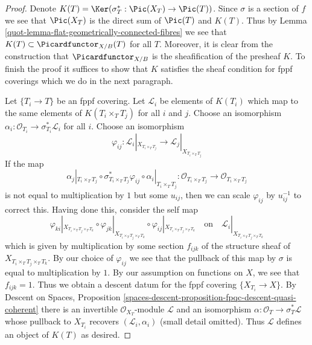 \begin{proof}

Denote $K(T) = \Ker(\sigma_T^* : \Pic(X_T) \to \Pic(T))$.
Since $\sigma$ is a section of $f$ we see that $\Pic(X_T)$ is the direct
sum of $\Pic(T)$ and $K(T)$.
Thus by Lemma \ref{quot-lemma-flat-geometrically-connected-fibres} we see that
$K(T) \subset \Picardfunctor_{X/B}(T)$ for all $T$. Moreover, it is clear
from the construction that $\Picardfunctor_{X/B}$ is the sheafification
of the presheaf $K$. To finish the proof it suffices to show that
$K$ satisfies the sheaf condition for fppf coverings which we do
in the next paragraph.

\medskip\noindent
Let $\{T_i \to T\}$ be an fppf covering. Let $\mathcal{L}_i$ be
elements of $K(T_i)$ which map to the same elements of $K(T_i \times_T T_j)$
for all $i$ and $j$. Choose an isomorphism
$\alpha_i : \mathcal{O}_{T_i} \to \sigma_{T_i}^*\mathcal{L}_i$
for all $i$. Choose an isomorphism
$$
\varphi_{ij} :
\mathcal{L}_i|_{X_{T_i \times_T T_j}}
\longrightarrow
\mathcal{L}_j|_{X_{T_i \times_T T_j}}
$$
If the map
$$
\alpha_j|_{T_i \times_T T_j} \circ
\sigma_{T_i \times_T T_j}^*\varphi_{ij} \circ
\alpha_i|_{T_i \times_T T_j} :
\mathcal{O}_{T_i \times_T T_j} \to \mathcal{O}_{T_i \times_T T_j}
$$
is not equal to multiplication by $1$ but some $u_{ij}$, then we can scale
$\varphi_{ij}$ by $u_{ij}^{-1}$ to correct this. Having done this, consider
the self map
$$
\varphi_{ki}|_{X_{T_i \times_T T_j \times_T T_k}} \circ
\varphi_{jk}|_{X_{T_i \times_T T_j \times_T T_k}} \circ
\varphi_{ij}|_{X_{T_i \times_T T_j \times_T T_k}}
\quad\text{on}\quad
\mathcal{L}_i|_{X_{T_i \times_T T_j \times_T T_k}}
$$
which is given by multiplication by some section $f_{ijk}$
of the structure sheaf of $X_{T_i \times_T T_j \times_T T_k}$.
By our choice of $\varphi_{ij}$ we see that the pullback of
this map by $\sigma$ is equal to multiplication by $1$. By
our assumption on functions on $X$, we see that $f_{ijk} = 1$.
Thus we obtain a descent datum for the fppf covering
$\{X_{T_i} \to X\}$. By
Descent on Spaces, Proposition
\ref{spaces-descent-proposition-fpqc-descent-quasi-coherent}
there is an invertible $\mathcal{O}_{X_T}$-module $\mathcal{L}$
and an isomorphism $\alpha : \mathcal{O}_T \to \sigma_T^*\mathcal{L}$
whose pullback to $X_{T_i}$ recovers $(\mathcal{L}_i, \alpha_i)$
(small detail omitted). Thus $\mathcal{L}$ defines an object
of $K(T)$ as desired.
\end{proof}

